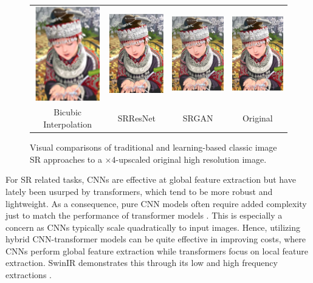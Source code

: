 \documentclass{article}
\begin{document}
\begin{figure}\label{fig:example}
    \centering
    \begin{tabular}{c c c c}
        \includegraphics[width=80pt]{bicubic.png} & \includegraphics[width=80pt]{srresnet.png} & \includegraphics[width=80pt]{srgan.png} & \includegraphics[width=80pt]{original.png} \\
        \small Bicubic Interpolation              & \small SRResNet                            & \small SRGAN                            & \small Original
    \end{tabular}
    \caption{Visual comparisons of traditional and learning-based classic image SR approaches to a $\times 4$-upscaled original high resolution image.}
\end{figure}

For SR related tasks, CNNs are effective at global feature extraction but have lately been usurped by transformers, which tend to be more robust and lightweight. As a consequence, pure CNN models often require added complexity just to match the performance of transformer models \citep{MLPMixer}. This is especially a concern as CNNs typically scale quadratically to input images. Hence, utilizing hybrid CNN-transformer models can be quite effective in improving costs, where CNNs perform global feature extraction while transformers focus on local feature extraction. SwinIR demonstrates this through its low and high frequency extractions \citep{SwinIR}.
\end{document}
